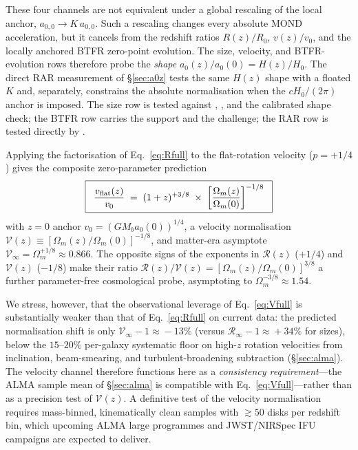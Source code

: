 \documentclass[twocolumn,letterpaper]{aastex631}
\newcommand{\azero}{a_0}
\newcommand{\azerolocal}{a_{0,0}}
\begin{document}
These four channels are not equivalent under a global rescaling
of the local anchor, $\azerolocal\!\to\!K\,\azerolocal$.  Such a
rescaling changes every absolute MOND acceleration, but it cancels
from the redshift ratios $R(z)/R_{0}$, $v(z)/v_{0}$, and the
locally anchored BTFR zero-point evolution.  The size, velocity,
and BTFR-evolution rows therefore probe the \emph{shape}
$\azero(z)/\azero(0)=H(z)/H_{0}$.  The direct RAR
measurement of \S\ref{sec:a0z} tests the same $H(z)$ shape with
a floated $K$ and, separately, constrains the absolute
normalisation when the $cH_0/(2\pi)$ anchor is imposed.  The size row is tested
against \citet{vanderWel2014}, \citet{Allen2017}, and the
calibrated \citet{Allen2025} shape check; the BTFR row carries
the \citet{Ubler2017} support and the \citet{Jeanneau2026}
challenge; the RAR row is tested directly by
\citet{Ciocan2026RAR}.

Applying the factorisation of Eq.~\ref{eq:Rfull} to the
flat-rotation velocity ($p=+1/4$) gives the composite
zero-parameter prediction
\begin{equation}\label{eq:Vfull}
  \boxed{\;\;\frac{v_{\rm flat}(z)}{v_{0}}
   \;=\;(1+z)^{+3/8}\;\times\;
   \left[\frac{\Omega_{m}(z)}{\Omega_{m}(0)}\right]^{-1/8}\;\;}
\end{equation}
with $z\!=\!0$ anchor $v_{0}\!=\!(GM_{b}\azero(0))^{1/4}$, a
velocity normalisation
$\mathcal{V}(z)\!\equiv\![\Omega_{m}(z)/\Omega_{m}(0)]^{-1/8}$,
and matter-era asymptote
$\mathcal{V}_{\infty}\!=\!\Omega_{m}^{+1/8}\!\approx\!0.866$.
The opposite signs of the exponents in $\mathcal{R}(z)$ ($+1/4$)
and $\mathcal{V}(z)$ ($-1/8$) make their ratio
$\mathcal{R}(z)/\mathcal{V}(z)=[\Omega_{m}(z)/\Omega_{m}(0)]^{3/8}$
a further parameter-free cosmological probe, asymptoting to
$\Omega_{m}^{-3/8}\!\approx\!1.54$.

We stress, however, that the observational leverage of
Eq.~\ref{eq:Vfull} is substantially weaker than that of
Eq.~\ref{eq:Rfull} on current data: the predicted normalisation
shift is only $\mathcal{V}_{\infty}\!-\!1\!\approx\!-13\%$ (versus
$\mathcal{R}_{\infty}\!-\!1\!\approx\!+34\%$ for sizes), below
the $15$--$20\%$ per-galaxy systematic floor on high-$z$ rotation
velocities from inclination, beam-smearing, and
turbulent-broadening subtraction (\S\ref{sec:alma}).  The
velocity channel therefore functions here as a \emph{consistency
requirement}---the ALMA sample mean of \S\ref{sec:alma} is
compatible with Eq.~\ref{eq:Vfull}---rather than as a precision
test of $\mathcal{V}(z)$.  A definitive test of the velocity
normalisation requires mass-binned, kinematically clean samples
with $\gtrsim 50$ disks per redshift bin, which upcoming ALMA
large programmes and JWST/NIRSpec IFU campaigns are expected to
deliver.
\end{document}
